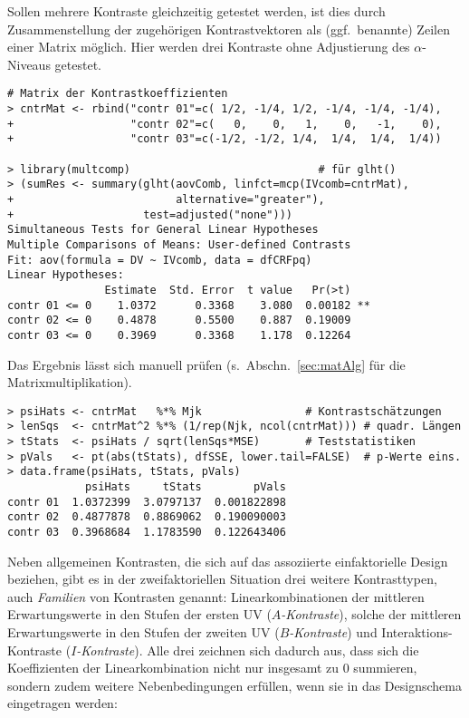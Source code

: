 Sollen mehrere Kontraste gleichzeitig getestet werden, ist dies durch Zusammenstellung der zugehörigen Kontrastvektoren als (ggf.\ benannte) Zeilen einer Matrix möglich. Hier werden drei Kontraste ohne Adjustierung des $\alpha$-Niveaus getestet.
\begin{lstlisting}
# Matrix der Kontrastkoeffizienten
> cntrMat <- rbind("contr 01"=c( 1/2, -1/4, 1/2, -1/4, -1/4, -1/4),
+                  "contr 02"=c(   0,    0,   1,    0,   -1,    0),
+                  "contr 03"=c(-1/2, -1/2, 1/4,  1/4,  1/4,  1/4))

> library(multcomp)                             # für glht()
> (sumRes <- summary(glht(aovComb, linfct=mcp(IVcomb=cntrMat),
+                         alternative="greater"),
+                    test=adjusted("none")))
Simultaneous Tests for General Linear Hypotheses
Multiple Comparisons of Means: User-defined Contrasts
Fit: aov(formula = DV ~ IVcomb, data = dfCRFpq)
Linear Hypotheses:
               Estimate  Std. Error  t value   Pr(>t)
contr 01 <= 0    1.0372      0.3368    3.080  0.00182 **
contr 02 <= 0    0.4878      0.5500    0.887  0.19009
contr 03 <= 0    0.3969      0.3368    1.178  0.12264
\end{lstlisting}

Das Ergebnis lässt sich manuell prüfen (s.\ Abschn.\ \ref{sec:matAlg} für die Matrixmultiplikation).
\begin{lstlisting}
> psiHats <- cntrMat   %*% Mjk                # Kontrastschätzungen
> lenSqs  <- cntrMat^2 %*% (1/rep(Njk, ncol(cntrMat))) # quadr. Längen
> tStats  <- psiHats / sqrt(lenSqs*MSE)       # Teststatistiken
> pVals   <- pt(abs(tStats), dfSSE, lower.tail=FALSE)  # p-Werte eins.
> data.frame(psiHats, tStats, pVals)
            psiHats     tStats        pVals
contr 01  1.0372399  3.0797137  0.001822898
contr 02  0.4877878  0.8869062  0.190090003
contr 03  0.3968684  1.1783590  0.122643406
\end{lstlisting}

Neben allgemeinen Kontrasten, die sich auf das assoziierte einfaktorielle Design beziehen, gibt es in der zweifaktoriellen Situation drei weitere Kontrasttypen, auch \emph{Familien} von Kontrasten genannt: Linearkombinationen der mittleren Erwartungswerte in den Stufen der ersten UV (\emph{$A$-Kontraste}), solche der mittleren Erwartungswerte in den Stufen der zweiten UV (\emph{$B$-Kontraste}) und Interaktions-Kontraste (\emph{$I$-Kontraste}). Alle drei zeichnen sich dadurch aus, dass sich die Koeffizienten der Linearkombination nicht nur insgesamt zu $0$ summieren, sondern zudem weitere Nebenbedingungen erfüllen, wenn sie in das Designschema eingetragen werden:

